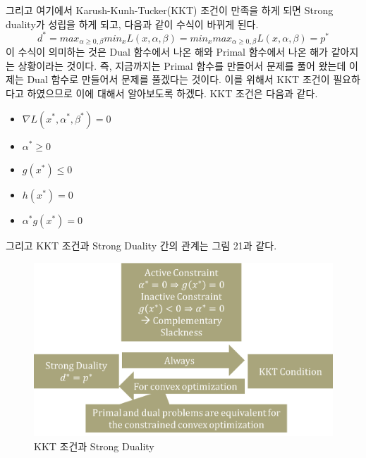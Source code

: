 \documentclass[a4paper]{oblivoir}
\begin{document}
그리고 여기에서 Karush-Kunh-Tucker(KKT) 조건이 만족을 하게 되면 Strong duality가 성립을 하게 되고, 다음과 같이 수식이 바뀌게 된다.
\begin{equation}
d^*=max_{\alpha\geq 0, \beta}min_{x} L(x,\alpha,\beta)= min_x max_{\alpha\geq 0, \beta} L(x,\alpha,\beta)=p^*
\label{eq:5-26}
\end{equation}
이 수식이 의미하는 것은 Dual 함수에서 나온 해와 Primal 함수에서 나온 해가 같아지는 상황이라는 것이다. 즉, 지금까지는 Primal 함수를 만들어서 문제를 풀어 왔는데 이제는 Dual 함수로 만들어서 문제를 풀겠다는 것이다. 이를 위해서 KKT 조건이 필요하다고 하였으므로 이에 대해서 알아보도록 하겠다. KKT 조건은 다음과 같다.

\begin{itemize}\setlength\itemsep{-\parsep}
	\item $\nabla L(x^*,\alpha^*,\beta^*)=0$
	\item $\alpha^*\geq 0$
	\item $g(x^*)\leq 0$
	\item $h(x^*)=0$
	\item $\alpha^*g(x^*)=0$
\end{itemize}
\indent 그리고 KKT 조건과 Strong Duality 간의 관계는 그림 21과 같다.
\begin{figure}[ht]\centering
\includegraphics[scale=0.5]{KKT}\caption{KKT 조건과 Strong Duality}\label{Fig:5-21}
\end{figure}


\end{document}
